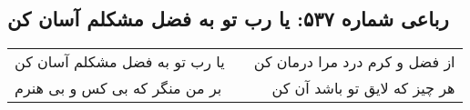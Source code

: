 \begin{center}
\section*{رباعی شماره ۵۳۷: یا رب تو به فضل مشکلم آسان کن}
\label{sec:sh537}
\begin{longtable}{l p{0.5cm} r}
یا رب تو به فضل مشکلم آسان کن
&&
از فضل و کرم درد مرا درمان کن
\\
بر من منگر که بی کس و بی هنرم
&&
هر چیز که لایق تو باشد آن کن
\\
\end{longtable}
\end{center}
